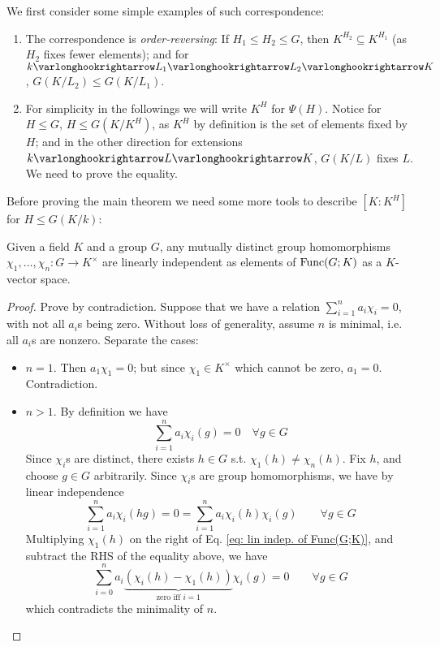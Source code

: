 \documentclass{article}
\begin{document}
\begin{remark}
    We first consider some simple examples of such correspondence:
    \begin{enumerate}[label=\arabic*)]
        \item The correspondence is \emph{order-reversing}: If $H_1 \leq H_2 \leq G$, then $K^{H_2} \subseteq K^{H_1}$ (as $H_2$ fixes fewer elements); and for $k \ext L_1 \ext L_2 \ext K$, $G(K/L_2) \leq G(K/L_1)$.
        \item For simplicity in the followings we will write $K^H$ for $\Psi(H)$. Notice for $H \leq G$, $H \leq G(K/K^H)$, as $K^H$ by definition is the set of elements fixed by $H$; and in the other direction for extensions $k \ext L \ext K$, $G(K/L)$ fixes $L$. We need to prove the equality. 
    \end{enumerate}
\end{remark}

\textstart
Before proving the main theorem we need some more tools to describe $[K : K^H]$ for $H \leq G(K/k)$:

\begin{proposition}
    Given a field $K$ and a group $G$, any mutually distinct group homomorphisms $\chi_1, \dots, \chi_n: G \to K^{\times}$ are linearly independent as elements of $\mathrm{Func}(G;K)$ as a $K$-vector space.
\end{proposition}

\begin{proof}
    Prove by contradiction. Suppose that we have a relation $\sum_{i = 1}^n a_i \chi_i = 0$, with not all $a_i$s being zero. Without loss of generality, assume $n$ is minimal, i.e. all $a_i$s are nonzero. Separate the cases:
    \begin{itemize}
        \item $n = 1$. Then $a_1 \chi_1 = 0$; but since $\chi_1 \in K^{\times}$ which cannot be zero, $a_1 = 0$. Contradiction.
        \item $n > 1$. By definition we have
        \begin{equation}\tag{$\ast$}\label{eq: lin indep. of Func(G;K)}
            \sum_{i = 1}^n a_i\chi_i(g) = 0 \quad \forall g \in G
        \end{equation}
        Since $\chi_i$s are distinct, there exists $h \in G$ s.t. $\chi_1(h) \neq \chi_n(h)$. Fix $h$, and choose $g \in G$ arbitrarily. Since $\chi_i$s are group homomorphisms, we have by linear independence
        \[
            \sum_{i = 1}^n a_i \chi_i(hg) = 0 = \sum_{i = 1}^n a_i \chi_i(h) \chi_i(g) \qquad \forall g \in G
        \]
        Multiplying $\chi_1(h)$ on the right of Eq. \eqref{eq: lin indep. of Func(G;K)}, and subtract the RHS of the equality above, we have
        \[
            \sum_{i = 0}^n a_i \underbrace{(\chi_i(h) - \chi_1(h))}_{\text{zero iff $i = 1$}} \chi_i(g) = 0 \qquad \forall g \in G
        \]
        which contradicts the minimality of $n$.
    \end{itemize}
\end{proof}
\end{document}
